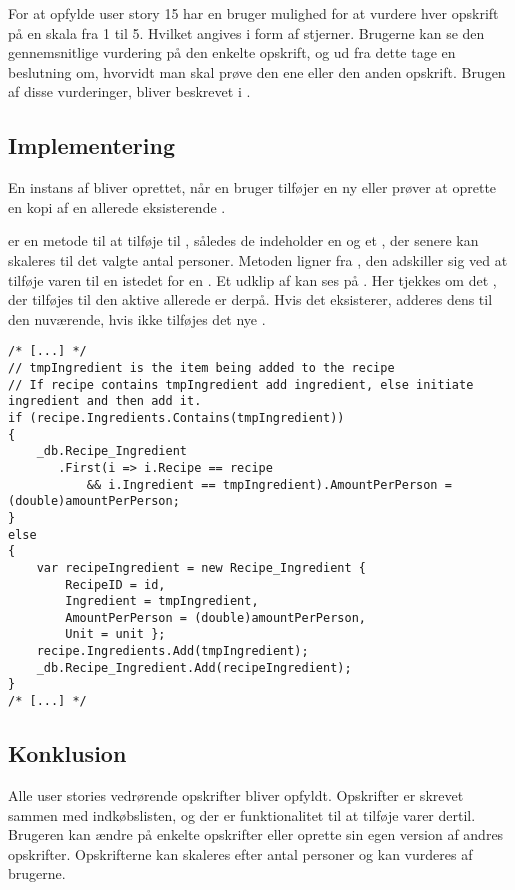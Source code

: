 For at opfylde user story  15 har en bruger mulighed for at vurdere hver opskrift på en skala fra 1 til 5.
Hvilket angives i form af stjerner.
Brugerne kan se den gennemsnitlige vurdering på den enkelte opskrift, og ud fra dette tage en beslutning om, hvorvidt man skal prøve den ene eller den anden opskrift.
Brugen af disse vurderinger, bliver beskrevet i .

\subsection{Implementering}
En instans af  bliver oprettet, når en bruger tilføjer en ny  eller prøver at oprette en kopi af en allerede eksisterende .

 er en metode til at tilføje  til , således de indeholder en  og et , der senere kan skaleres til det valgte antal personer. 
Metoden ligner  fra , den adskiller sig ved at tilføje varen til en  istedet for en .
Et udklip af  kan ses på .
Her tjekkes om det , der tilføjes til den aktive  allerede er derpå. 
Hvis det eksisterer, adderes dens  til den nuværende, hvis ikke tilføjes det nye .

\begin{lstlisting}[caption={Udklip fra \class{AddIngredient}},label=addIngredient]
/* [...] */      
// tmpIngredient is the item being added to the recipe
// If recipe contains tmpIngredient add ingredient, else initiate ingredient and then add it.
if (recipe.Ingredients.Contains(tmpIngredient))
{
    _db.Recipe_Ingredient
       .First(i => i.Recipe == recipe 
       	   && i.Ingredient == tmpIngredient).AmountPerPerson = (double)amountPerPerson;
}
else
{
    var recipeIngredient = new Recipe_Ingredient { 
    	RecipeID = id, 
    	Ingredient = tmpIngredient, 
    	AmountPerPerson = (double)amountPerPerson, 
    	Unit = unit };
    recipe.Ingredients.Add(tmpIngredient);
    _db.Recipe_Ingredient.Add(recipeIngredient);
}
/* [...] */          
\end{lstlisting}


\subsection{Konklusion}
Alle user stories vedrørende opskrifter bliver opfyldt. 
Opskrifter er skrevet sammen med indkøbslisten, og der er funktionalitet til at tilføje varer dertil. 
Brugeren kan ændre på enkelte opskrifter eller oprette sin egen version af andres opskrifter. 
Opskrifterne kan skaleres efter antal personer og kan vurderes af brugerne. 
